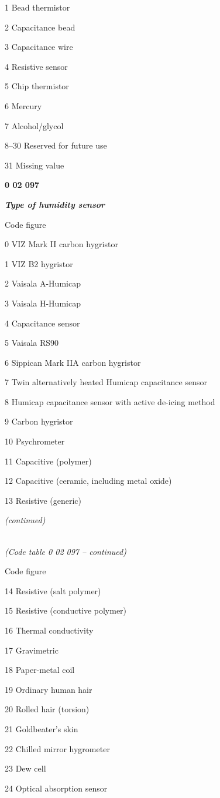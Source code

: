 1 Bead thermistor

2 Capacitance bead

3 Capacitance wire

4 Resistive sensor

5 Chip thermistor

6 Mercury

7 Alcohol/glycol

8--30 Reserved for future use

31 Missing value

\textbf{0 02 097}

\emph{\textbf{Type of humidity sensor}}

Code figure

0 VIZ Mark II carbon hygristor

1 VIZ B2 hygristor

2 Vaisala A-Humicap

3 Vaisala H-Humicap

4 Capacitance sensor

5 Vaisala RS90

6 Sippican Mark IIA carbon hygristor

7 Twin alternatively heated Humicap capacitance sensor

8 Humicap capacitance sensor with active de-icing method

9 Carbon hygristor

10 Psychrometer

11 Capacitive (polymer)

12 Capacitive (ceramic, including metal oxide)

13 Resistive (generic)

\emph{(continued)}

\emph{\\
} \emph{(Code table 0 02 097 -- continued)}

Code figure

14 Resistive (salt polymer)

15 Resistive (conductive polymer)

16 Thermal conductivity

17 Gravimetric

18 Paper-metal coil

19 Ordinary human hair

20 Rolled hair (torsion)

21 Goldbeater's skin

22 Chilled mirror hygrometer

23 Dew cell

24 Optical absorption sensor

